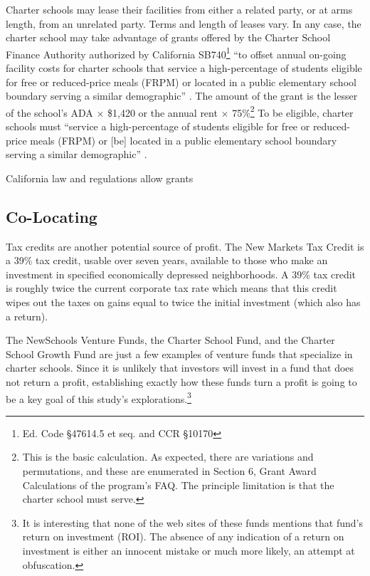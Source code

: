 Charter schools may lease their facilities from either a related party, or at arms length, from an unrelated party. Terms and length of leases vary. In any case, the charter school may take advantage of grants offered by the Charter School Finance Authority authorized by California SB740\footnote{Ed. Code §47614.5 et seq. and CCR §10170 } ``to offset annual on-going facility costs for charter schools that service a high-percentage of students eligible for free or reduced-price meals (FRPM) or located in a public elementary school boundary serving a similar demographic'' \parencite{CATreasurer2023}. The amount of the grant is the lesser of the school's ADA × \$1,420 or the annual rent × 75\%\footnote{This is the basic calculation. As expected, there are variations and permutations, and these are enumerated in Section 6, Grant Award Calculations of the program's FAQ. The principle limitation is that the charter school must serve.} To be eligible, charter schools must ``service a high-percentage of students eligible for free or reduced-price meals (FRPM) or [be] located in a public elementary school boundary serving a similar demographic'' \parencite{CATreasurer2023}.

California law and regulations allow grants 


\subsection{Co-Locating}\label{sec:co-locating}\indent



Tax credits are another potential source of profit. The New Markets Tax Credit is a 39\% tax credit, usable over seven years, available to those who make an investment in specified economically depressed neighborhoods. A 39\% tax credit is roughly twice the current corporate tax rate which means that this credit wipes out the taxes on gains equal to twice the initial investment (which also has a return). 

The NewSchools Venture Funds, the Charter School Fund, and the Charter School Growth Fund are just a few examples of venture funds that specialize in charter schools. Since it is unlikely that investors will invest in a fund that does not return a profit, establishing exactly how these funds turn a profit is going to be a key goal of this study's explorations.\footnote{It is interesting that none of the web sites of these funds mentions that fund's return on investment (ROI). The absence of any indication of a return on investment is either an innocent mistake or much more likely, an attempt at obfuscation.}



